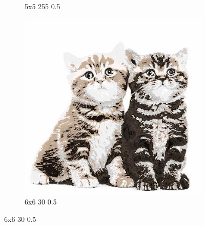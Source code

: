 \documentclass[12pt,a4paper]{article}
\begin{document}
\begin{figure}[H]
\begin{subfigure}{0.25\textwidth}
  \caption{5x5 255 0.5}
  \label{fig:5}
\end{subfigure}
\begin{subfigure}{0.25\textwidth}
  \includegraphics[width=\linewidth]{images/big/6-6-30-05}
  \caption{6x6 30 0.5}
  \label{fig:6}
\end{subfigure}\hfil %


\end{figure}
\end{document}
